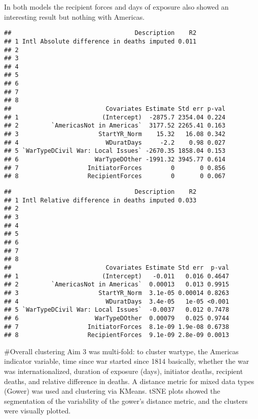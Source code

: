 \documentclass[
]{article}
\begin{document}
In both models the recipient forces and days of exposure also showed an
interesting result but nothing with Americas.

\begin{verbatim}
##                                  Description    R2
## 1 Intl Absolute difference in deaths imputed 0.011
## 2                                                 
## 3                                                 
## 4                                                 
## 5                                                 
## 6                                                 
## 7                                                 
## 8                                                 
##                          Covariates Estimate Std err p-val
## 1                       (Intercept)  -2875.7 2354.04 0.224
## 2         `AmericasNot in Americas`  3177.52 2265.41 0.163
## 3                      StartYR_Norm    15.32   16.08 0.342
## 4                        WDuratDays     -2.2    0.98 0.027
## 5 `WarTypeDCivil War: Local Issues` -2670.35 1858.04 0.153
## 6                     WarTypeDOther -1991.32 3945.77 0.614
## 7                   InitiatorForces        0       0 0.856
## 8                   RecipientForces        0       0 0.067
\end{verbatim}

\begin{verbatim}
##                                  Description    R2
## 1 Intl Relative difference in deaths imputed 0.033
## 2                                                 
## 3                                                 
## 4                                                 
## 5                                                 
## 6                                                 
## 7                                                 
## 8                                                 
##                          Covariates Estimate Std err  p-val
## 1                       (Intercept)   -0.011   0.016 0.4647
## 2         `AmericasNot in Americas`  0.00013   0.013 0.9915
## 3                      StartYR_Norm  3.1e-05 0.00014 0.8263
## 4                        WDuratDays  3.4e-05   1e-05 <0.001
## 5 `WarTypeDCivil War: Local Issues`  -0.0037   0.012 0.7478
## 6                     WarTypeDOther  0.00079   0.025 0.9744
## 7                   InitiatorForces  8.1e-09 1.9e-08 0.6738
## 8                   RecipientForces  9.1e-09 2.8e-09 0.0013
\end{verbatim}

\#Overall clustering Aim 3 was multi-fold: to cluster wartype, the
Americas indicator variable, time since war started since 1814
basically, whether the war was internationalized, duration of exposure
(days), initiator deaths, recipient deaths, and relative difference in
deaths. A distance metric for mixed data types (Gower) was used and
clustering via KMeans. tSNE plots showed the segmentation of the
variability of the gower's distance metric, and the clusters were
visually plotted.
\end{document}
